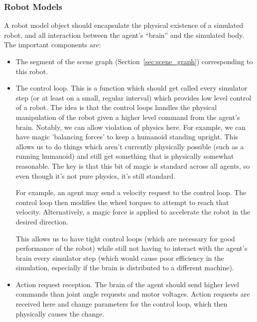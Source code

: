 \documentclass[a4paper,12pt]{article}
\begin{document}
\subsubsection{Robot Models}
\label{sec:robot_models}

A robot model object should encapsulate the physical existence of a
simulated robot, and all interaction between the agent's ``brain'' and
the simulated body. The important components are:

\begin{itemize}
 \item The segment of the scene graph (Section~\ref{sec:scene_graph})
  corresponding to this robot. 
  
 \item The control loop. This is a function which should get called
  every simulator step (or at least on a small, regular interval)
  which provides low level control of a robot. The idea is that the
  control loops handles the physical manipulation of the robot given a
  higher level command from the agent's brain. Notably, we can allow
  violation of physics here. For example, we can have magic 'balancing
  forces' to keep a humanoid standing upright. This allows us to do
  things which aren't currently physically possible (such as a running
  humanoid) and still get something that is physically somewhat
  reasonable. The key is that this bit of magic is standard across all
  agents, so even though it's not pure physics, it's still standard.
  
  For example, an agent may send a velocity request to the control
  loop. The control loop then modifies the wheel torques to attempt to
  reach that velocity. Alternatively, a magic force is applied to
  accelerate the robot in the desired direction.

  This allows us to have tight control loops (which are necessary for
  good performance of the robot) while still not having to interact
  with the agent's brain every simulator step (which would cause poor
  efficiency in the simulation, especially if the brain is distributed
  to a different machine).

 \item Action request reception. The brain of the agent should send
  higher level commands than joint angle requests and motor
  voltages. Action requests are received here and change parameters
  for the control loop, which then physically causes the
  change. 

\end{itemize}





\end{document}
